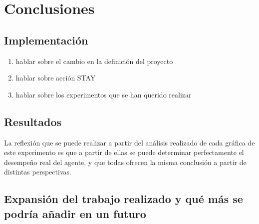 
\chapter{Conclusiones}

\section{Implementación}

\begin{enumerate}
    \item hablar sobre el cambio en la definición del proyecto
    \item hablar sobre acción STAY
    \item hablar sobre los experimentos que se han querido realizar
\end{enumerate}

\section{Resultados}


La reflexión que se puede realizar a partir del análisis realizado de cada gráfica de este experimento es que a partir de ellas se puede determinar perfectamente el desempeño real del agente, y que todas ofrecen la misma conclusión a partir de distintas perspectivas. 

\section{Expansión del trabajo realizado y qué más se podría añadir en un futuro}